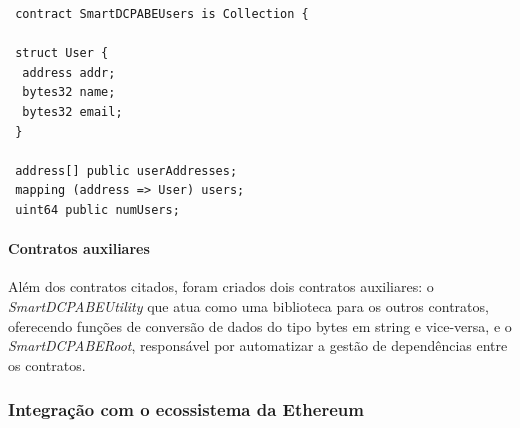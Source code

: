 \documentclass[a4paper,11pt]{article}
\begin{document}

\begin{lstlisting}
 contract SmartDCPABEUsers is Collection {

 struct User {
  address addr;
  bytes32 name;
  bytes32 email;
 }

 address[] public userAddresses;
 mapping (address => User) users;
 uint64 public numUsers;
\end{lstlisting}



\paragraph{Contratos auxiliares}

Além dos contratos citados, foram criados dois contratos auxiliares: o \emph{SmartDCPABEUtility} que atua como uma biblioteca para os outros contratos, oferecendo funções de conversão de dados do tipo bytes em string e vice-versa, e o \emph{SmartDCPABERoot}, responsável por automatizar a gestão de dependências entre os contratos.

\subsubsection{Integração com o ecossistema da Ethereum}


\end{document}
